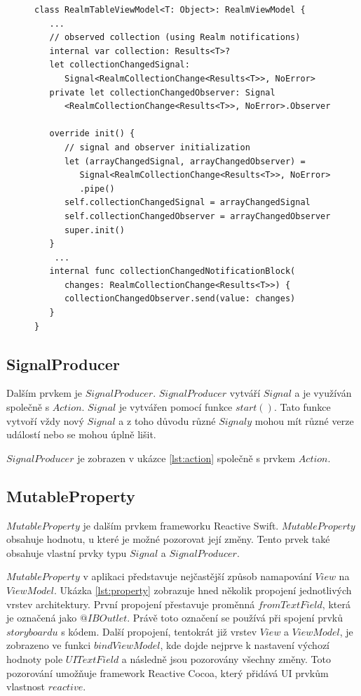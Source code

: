 \documentclass[thesis=M,czech]{FITthesis}[2012/06/26]
\begin{document}
\begin{figure}
\begin{minipage}{\linewidth}
\begin{lstlisting}[caption={Ukázka použití prvku Signal},label={lst:signal}]
class RealmTableViewModel<T: Object>: RealmViewModel {
   ...
   // observed collection (using Realm notifications)
   internal var collection: Results<T>?
   let collectionChangedSignal: 
      Signal<RealmCollectionChange<Results<T>>, NoError>
   private let collectionChangedObserver: Signal
      <RealmCollectionChange<Results<T>>, NoError>.Observer

   override init() {
      // signal and observer initialization
      let (arrayChangedSignal, arrayChangedObserver) = 
         Signal<RealmCollectionChange<Results<T>>, NoError>
         .pipe()
      self.collectionChangedSignal = arrayChangedSignal
      self.collectionChangedObserver = arrayChangedObserver
      super.init()
   }
    ...
   internal func collectionChangedNotificationBlock(
      changes: RealmCollectionChange<Results<T>>) {
      collectionChangedObserver.send(value: changes)
   }
}
\end{lstlisting}
\end{minipage}
\end{figure}	

\subsection{SignalProducer}
Dalším prvkem je $SignalProducer$. $SignalProducer$ vytváří $Signal$ a je využíván společně s $Action$. $Signal$ je vytvářen pomocí funkce $start()$. Tato funkce vytvoří vždy nový $Signal$ a z toho důvodu různé $Signaly$ mohou mít různé verze událostí nebo se mohou úplně lišit. \cite{signalProducer}

$SignalProducer$ je zobrazen v ukázce \ref{lst:action} společně s prvkem $Action$.

\subsection{MutableProperty}
$MutableProperty$ je dalším prvkem frameworku Reactive Swift. $MutableProperty$ obsahuje hodnotu, u které je možné pozorovat její změny. Tento prvek také obsahuje vlastní prvky typu $Signal$ a $SignalProducer$. \cite{property}

$MutableProperty$ v aplikaci představuje nejčastější způsob namapování $View$ na $ViewModel$. Ukázka \ref{lst:property} zobrazuje hned několik propojení jednotlivých vrstev architektury. První propojení přestavuje proměnná $fromTextField$, která je označená jako $@IBOutlet$. Právě toto označení se používá při spojení prvků $storyboardu$ s kódem. Další propojení, tentokrát již vrstev $View$ a $ViewModel$, je zobrazeno ve funkci $bindViewModel$, kde dojde nejprve k nastavení výchozí hodnoty pole $UITextField$ a následně jsou pozorovány všechny změny. Toto pozorování umožňuje framework Reactive Cocoa, který přidává UI prvkům vlastnost $reactive$.
\end{document}
